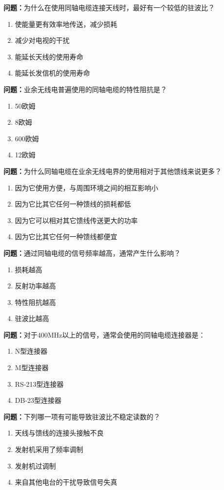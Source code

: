 \documentclass{ctexbook}
\begin{document}
\textbf{问题：}为什么在使用同轴电缆连接天线时，最好有一个较低的驻波比？
\begin{enumerate}[label=\Alph*), leftmargin=3em]
\item 使能量更有效率地传送，减少损耗
\item 减少对电视的干扰
\item 能延长天线的使用寿命
\item 能延长发信机的使用寿命
\end{enumerate}

\textbf{问题：}业余无线电普遍使用的同轴电缆的特性阻抗是？
\begin{enumerate}[label=\Alph*), leftmargin=3em]
\item 50欧姆
\item 8欧姆
\item 600欧姆
\item 12欧姆
\end{enumerate}

\textbf{问题：}为什么同轴电缆在业余无线电界的使用相对于其他馈线来说更多？
\begin{enumerate}[label=\Alph*), leftmargin=3em]
\item 因为它使用方便，与周围环境之间的相互影响小
\item 因为它比其它任何一种馈线的损耗都低
\item 因为它可以相对其它馈线传送更大的功率
\item 因为它比其它任何一种馈线都便宜
\end{enumerate}

\textbf{问题：}通过同轴电缆的信号频率越高，通常产生什么影响？
\begin{enumerate}[label=\Alph*), leftmargin=3em]
\item 损耗越高
\item 反射功率越高
\item 特性阻抗越高
\item 驻波比越高
\end{enumerate}

\textbf{问题：}对于400MHz以上的信号，通常会使用的同轴电缆连接器是：
\begin{enumerate}[label=\Alph*), leftmargin=3em]
\item N型连接器
\item M型连接器
\item RS-213型连接器
\item DB-23型连接器
\end{enumerate}

\textbf{问题：}下列哪一项有可能导致驻波比不稳定读数的？
\begin{enumerate}[label=\Alph*), leftmargin=3em]
\item 天线与馈线的连接头接触不良
\item 发射机采用了频率调制
\item 发射机过调制
\item 来自其他电台的干扰导致信号失真
\end{enumerate}
\end{document}
